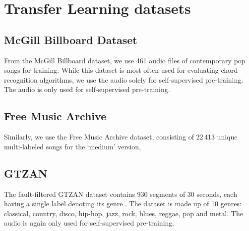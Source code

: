 

\section{Transfer Learning datasets}
\subsection{McGill Billboard Dataset}
From the McGill Billboard dataset, we use 461 audio files of contemporary pop songs for training.
While this dataset is most often used for evaluating chord recognition algorithms, we use the audio solely for self-supervised pre-training. The audio is only used for self-supervised pre-training.

\subsection{Free Music Archive}
Similarly, we use the Free Music Archive dataset, consisting of 22\,413 unique multi-labeled songs for the `medium' version, 

\subsection{GTZAN}
The fault-filtered GTZAN dataset contains 930 segments of 30 seconds, each having a single label denoting its genre \cite{Sturm2015, tzanetakis2002musical}. The dataset is made up of 10 genres: classical, country, disco, hip-hop, jazz, rock, blues, reggae, pop and metal. The audio is again only used for self-supervised pre-training.

